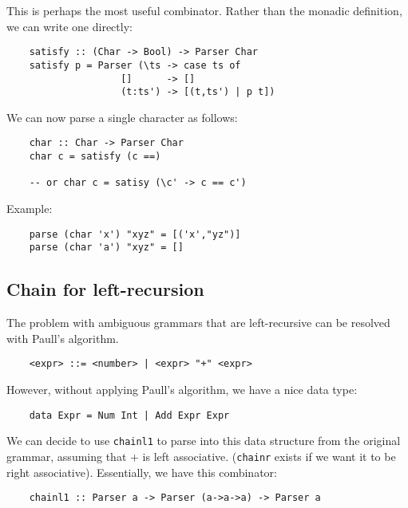 \documentclass[a4paper,12pt]{article}
\theoremstyle{remark}
\begin{document}
This is perhaps the most useful combinator. Rather than the monadic definition, we can write
one directly:

\begin{lstlisting}
    satisfy :: (Char -> Bool) -> Parser Char
    satisfy p = Parser (\ts -> case ts of
                    []      -> []
                    (t:ts') -> [(t,ts') | p t])  \end{lstlisting}

We can now parse a single character as follows:

\begin{lstlisting}
    char :: Char -> Parser Char
    char c = satisfy (c ==)

    -- or char c = satisy (\c' -> c == c')  \end{lstlisting}

Example:

\begin{lstlisting}
    parse (char 'x') "xyz" = [('x',"yz")]
    parse (char 'a') "xyz" = []  \end{lstlisting}


\subsection{Chain for left-recursion}

The problem with ambiguous grammars that are left-recursive can be resolved with
Paull's algorithm.

\begin{lstlisting}
    <expr> ::= <number> | <expr> "+" <expr>  \end{lstlisting}

However, without applying Paull's algorithm, we have a nice data type:

\begin{lstlisting}
    data Expr = Num Int | Add Expr Expr  \end{lstlisting}

We can decide to use \lstinline{chainl1} to parse into this data structure from the original
grammar, assuming that $+$ is left associative. (\lstinline{chainr} exists if we want it to be
right associative). Essentially, we have this combinator:

\begin{lstlisting}
    chainl1 :: Parser a -> Parser (a->a->a) -> Parser a  \end{lstlisting}
\end{document}
